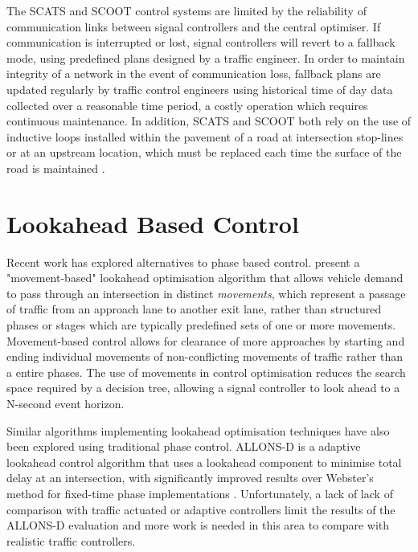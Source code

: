 The SCATS and SCOOT control systems are limited by the reliability of communication links between signal controllers and the central optimiser. If communication is interrupted or lost, signal controllers will revert to a fallback mode, using predefined plans designed by a traffic engineer. In order to maintain integrity of a network in the event of communication loss, fallback plans are updated regularly by traffic control engineers using historical time of day data collected over a reasonable time period, a costly operation which requires continuous maintenance. In addition, SCATS and SCOOT both rely on the use of inductive loops installed within the pavement of a road at intersection stop-lines or at an upstream location, which must be replaced each time the surface of the road is maintained  \cite{bell1992future}.

\section{Lookahead Based Control}

Recent work has explored alternatives to phase based control.  present a "movement-based" lookahead optimisation algorithm that allows vehicle demand to pass through an intersection in distinct \emph{movements}, which represent a passage of traffic from an approach lane to another exit lane, rather than structured phases or stages which are typically predefined sets of one or more movements. Movement-based control allows for clearance of more approaches by starting and ending individual movements of non-conflicting movements of traffic rather than a entire phases. The use of movements in control optimisation reduces the search space required by a decision tree, allowing a signal controller to look ahead to a N-second event horizon.

Similar algorithms implementing lookahead optimisation techniques have also been explored using traditional phase control. ALLONS-D is a adaptive lookahead control algorithm that uses a lookahead component to minimise total delay at an intersection, with significantly improved results over Webster's method for fixed-time phase implementations \cite{porche1996allonsd}. Unfortunately, a lack of  lack of comparison with traffic actuated or adaptive controllers limit the results of the ALLONS-D evaluation and more work is needed in this area to compare with realistic traffic controllers.

